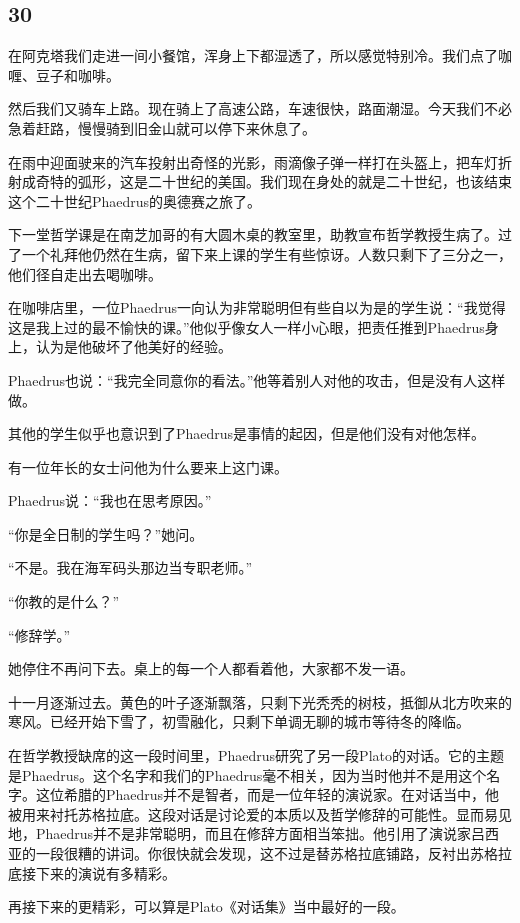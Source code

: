 \documentclass[UTF8]{article}
\begin{document}
\subsection*{30}
\par 在阿克塔我们走进一间小餐馆，浑身上下都湿透了，所以感觉特别冷。我们点了咖喱、豆子和咖啡。
\par 然后我们又骑车上路。现在骑上了高速公路，车速很快，路面潮湿。今天我们不必急着赶路，慢慢骑到旧金山就可以停下来休息了。
\par 在雨中迎面驶来的汽车投射出奇怪的光影，雨滴像子弹一样打在头盔上，把车灯折射成奇特的弧形，这是二十世纪的美国。我们现在身处的就是二十世纪，也该结束这个二十世纪Phaedrus的奥德赛之旅了。
\par 下一堂哲学课是在南芝加哥的有大圆木桌的教室里，助教宣布哲学教授生病了。过了一个礼拜他仍然在生病，留下来上课的学生有些惊讶。人数只剩下了三分之一，他们径自走出去喝咖啡。
\par 在咖啡店里，一位Phaedrus一向认为非常聪明但有些自以为是的学生说：“我觉得这是我上过的最不愉快的课。”他似乎像女人一样小心眼，把责任推到Phaedrus身上，认为是他破坏了他美好的经验。
\par Phaedrus也说：“我完全同意你的看法。”他等着别人对他的攻击，但是没有人这样做。
\par 其他的学生似乎也意识到了Phaedrus是事情的起因，但是他们没有对他怎样。
\par 有一位年长的女士问他为什么要来上这门课。
\par Phaedrus说：“我也在思考原因。”
\par “你是全日制的学生吗？”她问。
\par “不是。我在海军码头那边当专职老师。”
\par “你教的是什么？”
\par “修辞学。”
\par 她停住不再问下去。桌上的每一个人都看着他，大家都不发一语。
\par 十一月逐渐过去。黄色的叶子逐渐飘落，只剩下光秃秃的树枝，抵御从北方吹来的寒风。已经开始下雪了，初雪融化，只剩下单调无聊的城市等待冬的降临。
\par 在哲学教授缺席的这一段时间里，Phaedrus研究了另一段Plato的对话。它的主题是Phaedrus。这个名字和我们的Phaedrus毫不相关，因为当时他并不是用这个名字。这位希腊的Phaedrus并不是智者，而是一位年轻的演说家。在对话当中，他被用来衬托苏格拉底。这段对话是讨论爱的本质以及哲学修辞的可能性。显而易见地，Phaedrus并不是非常聪明，而且在修辞方面相当笨拙。他引用了演说家吕西亚的一段很糟的讲词。你很快就会发现，这不过是替苏格拉底铺路，反衬出苏格拉底接下来的演说有多精彩。
\par 再接下来的更精彩，可以算是Plato《对话集》当中最好的一段。
\end{document}
